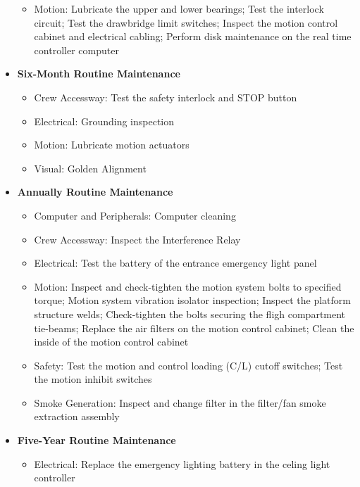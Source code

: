 \begin{itemize}
\begin{itemize}
                \item Motion: Lubricate the upper and lower bearings; Test the interlock circuit; Test the drawbridge limit switches; Inspect 
                the motion control cabinet and electrical cabling; Perform disk maintenance on the real time controller computer
            \end{itemize}
            \item \textbf{Six-Month Routine Maintenance}
            \begin{itemize}
                \item Crew Accessway: Test the safety interlock and STOP button
                \item Electrical: Grounding inspection
                \item Motion: Lubricate motion actuators
                \item Visual: Golden Alignment
            \end{itemize}
            \item \textbf{Annually Routine Maintenance}
            \begin{itemize}
                \item Computer and Peripherals: Computer cleaning
                \item Crew Accessway: Inspect the Interference Relay
                \item Electrical: Test the battery of the entrance emergency light panel
                \item Motion: Inspect and check-tighten the motion system bolts to specified torque; Motion system vibration isolator inspection; 
                Inspect the platform structure welds; Check-tighten the bolts securing the fligh compartment tie-beams; Replace the air filters 
                on the motion control cabinet; Clean the inside of the motion control cabinet
                \item Safety: Test the motion and control loading (C/L) cutoff switches; Test the motion inhibit switches
                \item Smoke Generation: Inspect and change filter in the filter/fan smoke extraction assembly
            \end{itemize}
            \item \textbf{Five-Year Routine Maintenance}
            \begin{itemize}
                \item Electrical: Replace the emergency lighting battery in the celing light controller
            \end{itemize}
        \end{itemize} 
